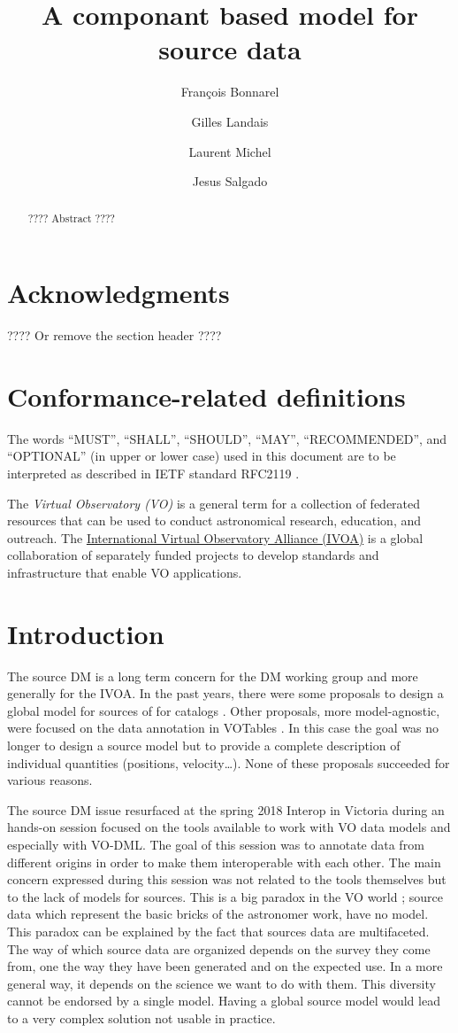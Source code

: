 \documentclass[11pt,a4paper]{ivoa}
\title{A componant based model for source data}
\author{François Bonnarel}
\author{Gilles Landais}
\author{Laurent Michel}
\author{Jesus Salgado}
\begin{document}
\begin{abstract}
???? Abstract ????
\end{abstract}


\section*{Acknowledgments}

???? Or remove the section header ????

\section*{Conformance-related definitions}

The words ``MUST'', ``SHALL'', ``SHOULD'', ``MAY'', ``RECOMMENDED'', and
``OPTIONAL'' (in upper or lower case) used in this document are to be
interpreted as described in IETF standard RFC2119 \citep{std:RFC2119}.

The \emph{Virtual Observatory (VO)} is a
general term for a collection of federated resources that can be used
to conduct astronomical research, education, and outreach.
The \href{http://www.ivoa.net}{International
Virtual Observatory Alliance (IVOA)} is a global
collaboration of separately funded projects to develop standards and
infrastructure that enable VO applications.


\section{Introduction}

The source DM is a long term concern for the DM working group and more generally for the IVOA.
In the past years, there were some proposals to design a global model for sources \citep{wd:jesusdm} of for catalogs \citep{wd:catalog}.
Other proposals, more model-agnostic, were focused on the data annotation in VOTables \citep{note:stcvot} \citep{note:seb}. In this case the goal was no longer to design a source model but to provide a complete description of  individual quantities (positions, velocity…).
None of these proposals succeeded for various reasons. 

The source DM issue resurfaced at the spring 2018 Interop in Victoria during an hands-on session focused on the tools available to work with VO data models and especially with VO-DML. The goal of this session was to annotate data from different origins in order to make them interoperable with each other. The main concern expressed during this session was not related to the tools themselves but to the lack of models for sources. 
This is a big paradox in the VO world ; source data which represent the basic bricks of the astronomer work, have no model. This paradox can be explained by the fact that sources data are multifaceted. The way of which source data are organized depends on the survey they come from, one the way they have been generated  and on the expected use. In a more general way, it depends on the science we want to do with them. This diversity cannot be endorsed by a single model. Having a global source model would lead to a very complex solution not usable in practice.
\end{document}
